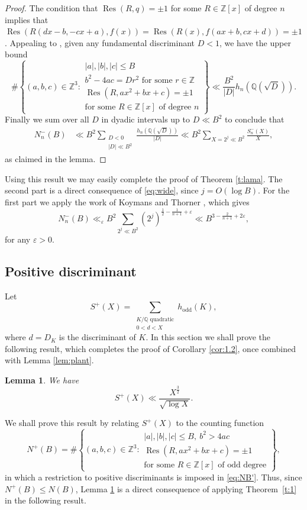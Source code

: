 \documentclass[reqno, 12pt, twoside]{amsart}
\numberwithin{equation}{section}
\DeclareMathOperator{\Res}{Res}
\newcommand{\Q}{\mathbb{Q}}
\newcommand{\Z}{\mathbb{Z}}
\newcommand{\ZZ}{\mathbb{Z}}
\newcommand{\QQ}{\mathbb{Q}}
\newcommand{\ve}{\varepsilon}
\newcommand{\0}{\mathbf{0}}
\newtheorem{lemma}[theorem]{Lemma}
\theoremstyle{definition}
\renewcommand{\leq}{\leqslant}
\begin{document}
\begin{proof}
The condition that $\Res(R,q)=\pm 1$ for some $R\in\Z[x]$ of degree $n$ implies that 
$\Res(R(dx-b,-cx+a),f(x))=\Res(R(x),f(ax+b,cx+d))=\pm 1$.
Appealing to \cite[Thm.~1.1]{aaron}, given any fundamental discriminant $D<1$, we have the upper bound
\[
\#\left\{(a,b,c)\in \ZZ^3: 
\begin{array}{l}
|a|,|b|,|c|\leq B\\
b^2-4ac=Dr^2\text{ for some }r\in\Z\\
\Res(R,ax^2+bx+c)=\pm 1\\ 
\text{for some $R\in \ZZ[x]$ of degree $n$}
\end{array}
\right\}
\ll \frac{B^{2}}{|D|}h_n(\Q(\sqrt{D})).
\]
Finally we sum over all $D$ in dyadic intervals up to $D\ll B^2$ 
to conclude that 
\begin{align*}
N_n^-(B)
&\ll B^2 \sum_{\substack{D<0\\ |D|\ll B^2}} \frac{h_n(\Q(\sqrt{D}))}{|D|}
\ll B^2 \sum_{X=2^j \ll B^2} \frac{S_n^-(X)}{X},
\end{align*}
as claimed in the lemma.
\end{proof}

Using this result we may easily complete the proof of 
Theorem \ref{t:lama}. The second part is a direct consequence of \eqref{eq:wide}, since 
 $j=O(\log B)$. For the first part we apply the work 
of Koymans and Thorner
\cite{koy}, which gives 
$$
N_n^-(B)\ll_\ve 
B^2 \sum_{2^j \ll B^2} 
(2^j)^{\frac{1}{2}-\frac{1}{n+1}+\ve}\ll B^{3-\frac{2}{n+1}+2\ve},
$$
for any $\ve>0$. 



\subsection{Positive discriminant}\label{sec:disc2}

Let 
$$
S^+(X)=
\sum_{
\substack{K/\QQ \text{ quadratic}\\
0<d<X
}}  h_\text{odd}(K),
$$
where $d=D_K$ is the discriminant of $K$.
In this section we shall prove the following result, which completes the proof of Corollary \ref{cor:1.2}, once combined with Lemma \ref{lem:plant}.

\begin{lemma}\label{lem:fish}
We have 
$$
S^+(X)\ll \frac{X^{\frac{3}{2}}}{\sqrt{\log X}}.
$$
\end{lemma}




We shall prove this result by  relating $S^+(X)$  to the counting function
$$
N^+(B)=\#\left\{(a,b,c)\in \ZZ^3: 
\begin{array}{l}
|a|,|b|,|c|\leq B, ~b^2>4ac\\
\Res(R,ax^2+bx+c)=\pm 1\\ 
\text{for some $R\in \ZZ[x]$ of odd degree}
\end{array}
\right\},
$$
in which a restriction to positive discriminants is imposed in
\eqref{eq:NB'}.  Thus, since $N^+(B)\leq N(B)$, 
 Lemma \ref{lem:fish} is a direct consequence of 
applying Theorem~\ref{t:1} in 
 the following result.
\end{document}
